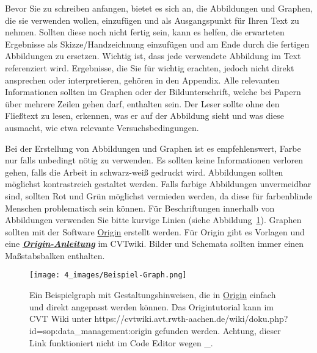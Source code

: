     Bevor Sie zu schreiben anfangen, bietet es sich an, die Abbildungen und Graphen, die sie verwenden wollen, einzufügen und als Ausgangspunkt für Ihren Text zu nehmen. Sollten diese noch nicht fertig sein, kann es helfen, die erwarteten Ergebnisse als Skizze/Handzeichnung einzufügen und am Ende durch die fertigen Abbildungen zu ersetzen. Wichtig ist, dass jede verwendete Abbildung im Text referenziert wird. Ergebnisse, die Sie für wichtig erachten, jedoch nicht direkt ansprechen oder interpretieren, gehören in den Appendix. Alle relevanten Informationen sollten im Graphen oder der Bildunterschrift, welche bei Papern über mehrere Zeilen gehen darf, enthalten sein. Der Leser sollte ohne den Fließtext zu lesen, erkennen, was er auf der Abbildung sieht und was diese ausmacht, wie etwa relevante Versuchsbedingungen.
    
    Bei der Erstellung von Abbildungen und Graphen ist es empfehlenswert, Farbe nur falls unbedingt nötig zu verwenden. Es sollten keine Informationen verloren gehen, falls die Arbeit in schwarz-weiß gedruckt wird. Abbildungen sollten möglichst kontrastreich gestaltet werden. Falls farbige Abbildungen unvermeidbar sind, sollten Rot und Grün möglichst vermieden werden, da diese für farbenblinde Menschen problematisch sein können. Für Beschriftungen innerhalb von Abbildungen verwenden Sie bitte kurvige Linien (siehe Abbildung~\ref{fig:Beispielgraph}). Graphen sollten mit der Software \href{https://www.originlab.com/}{Origin} erstellt werden. Für Origin gibt es Vorlagen und eine \href{https://cvtwiki.avt.rwth-aachen.de/wiki/doku.php?id=sop:data_management:origin}{\textbf{\textit{Origin-Anleitung}}} im CVTwiki. Bilder und Schemata sollten immer einen Maßstabsbalken enthalten.
    
    \begin{figure}[h]	%
    		\begin{center}
    		  \texttt{[image: 4\_images/Beispiel-Graph.png]}
    		  \caption[Beispielgraph]{Ein Beispielgraph mit Gestaltungshinweisen, die in \href{https://cvtwiki.avt.rwth-aachen.de/wiki/doku.php?id=sop:data_management:origin}{Origin} einfach und direkt angepasst werden können. Das Origintutorial kann im CVT Wiki unter https://cvtwiki.avt.rwth-aachen.de/wiki/doku.php?id=sop:data\_management:origin gefunden werden. Achtung, dieser Link funktioniert nicht im Code Editor wegen \_.}\label{fig:Beispielgraph}
    		\end{center}
    \end{figure}
    
